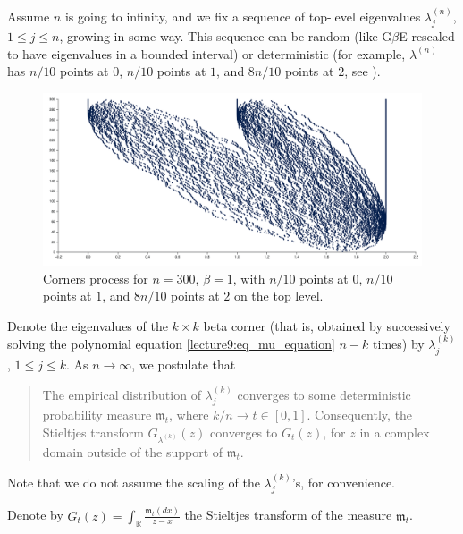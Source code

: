 \documentclass[letterpaper,11pt,oneside,reqno]{book}
\numberwithin{equation}{chapter}  %
\theoremstyle{definition}
\begin{document}
Assume $n$ is going to infinity, and we fix a sequence of
top-level eigenvalues $\lambda^{(n)}_j$, $1\le j \le n$,
growing in some way. This sequence can be random
(like G$\beta$E rescaled to have eigenvalues in a bounded interval)
or deterministic
(for example, $\lambda^{(n)}$ has $n/10$ points at $0$,
$n/10$ points at $1$, and $8n/10$ points at $2$,
see ).
\begin{figure}[htpb]
	\centering
	\includegraphics[width=\textwidth]{./pictures/corners.png}
	\caption{Corners process for $n=300$,
	$\beta=1$, with $n/10$ points at $0$,
	$n/10$ points at $1$, and $8n/10$ points at $2$ on the top level.}
	\label{lecture9:fig:corners}
\end{figure}

Denote the eigenvalues
of the $k\times k$ beta corner (that is,
obtained by successively solving the polynomial equation
\eqref{lecture9:eq_mu_equation}
$n-k$ times) by $\lambda^{(k)}_j$, $1\le j \le k$.
As $n\to\infty$, we postulate that
\begin{quote}
	The empirical distribution of $\lambda^{(k)}_j$
	converges to some deterministic probability measure
	$\mathfrak{m}_t$, where $k/n\to t\in[0,1]$.
	Consequently, the Stieltjes transform $G_{\lambda^{(k)}}(z)$
	converges to $G_t(z)$, for $z$ in a complex domain
	outside of the support of $\mathfrak{m}_t$.
\end{quote}
Note that we do not assume the scaling of the
$\lambda^{(k)}_j$'s, for convenience.

Denote by $\displaystyle
G_t(z)=\int_{\mathbb{R}}\frac{\mathfrak{m}_t(dx)}{z-x}$
the Stieltjes transform of the measure $\mathfrak{m}_t$.
\end{document}
